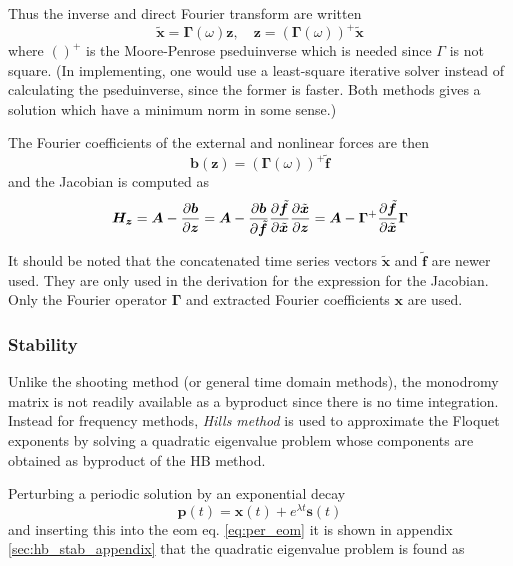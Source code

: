 Thus the inverse and direct Fourier transform are written
\begin{equation}
  \label{eq:hb_four_transform}
    \tilde{\bm x} = \bm \Gamma(\omega) \bm z, \quad
    \bm z =( \bm \Gamma(\omega))^+ \tilde{\bm x}
\end{equation}
where $()^+$ is the Moore-Penrose pseduinverse which is needed since $\Gamma$ is
not square. (In implementing, one would use a least-square iterative solver
instead of calculating the pseduinverse, since the former is faster. Both
methods gives a solution which have a minimum norm in some sense.)

The Fourier coefficients of the external and nonlinear forces are then
\begin{equation}
  \label{eq:hb_b_coeff}
  \bm b(\bm z) = ( \bm \Gamma(\omega))^+ \tilde{\bm f}
\end{equation}
and the Jacobian is computed as
\begin{equation}
  \label{eq:hb_jac}
  \bm H_{\bm z} = \bm A - \frac{\partial \bm b}{\partial \bm z} =
  \bm A -
  \frac{\partial\bm b}{\partial \tilde{\bm f}}
  \frac{\partial \tilde{\bm f}}{\partial \tilde{\bm x}}
  \frac{\partial \tilde{\bm x}}{\partial \bm z} =
  \bm A - \bm \Gamma^+ \frac{\partial \tilde{\bm f}}{\partial \tilde{\bm x}} \bm \Gamma
\end{equation}

It should be noted that the concatenated time series vectors $\tilde{\bm x}$ and
$\tilde{\bm f}$ are newer used. They are only used in the derivation for the
expression for the Jacobian. Only the Fourier operator $\bm \Gamma$ and
extracted Fourier coefficients $\bm x$ are used.


\subsubsection{Stability}
\label{sec:hb_stab}

Unlike the shooting method (or general time domain methods), the monodromy
matrix is not readily available as a byproduct since there is no time
integration. Instead for frequency methods, \textit{Hills method} is used to
approximate the Floquet exponents by solving a quadratic eigenvalue problem
whose components are obtained as byproduct of the HB method.

Perturbing a periodic solution by an exponential decay
\begin{equation}
  \label{eq:hb_pert}
  \bm p(t) = \bm x(t) + e^{\lambda t}\bm s(t)
\end{equation}
and inserting this into the eom eq. \eqref{eq:per_eom} it is shown in appendix
\ref{sec:hb_stab_appendix} that the quadratic eigenvalue problem is found as

